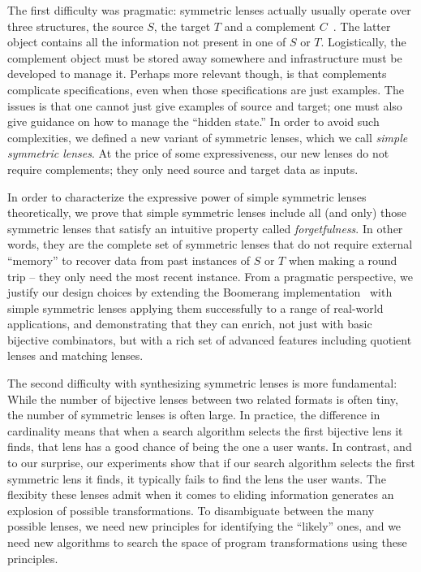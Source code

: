 \documentclass[acmsmall,screen,anonymous]{acmart}
\begin{document}
The first difficulty was pragmatic: symmetric lenses actually usually operate
over three structures, the source $S$, the target $T$ and a complement
$C$~\cite{symmetric-lenses}. The latter object contains all the information not
present in one of $S$ or $T$. Logistically, the complement object must be stored
away somewhere and infrastructure must be developed to manage it. Perhaps more
relevant though, is that complements complicate specifications, even when those
specifications are just examples. The issues is that one cannot just give
examples of source and target; one must also give guidance on how to manage the
``hidden state.'' In order to avoid such complexities, we defined a new variant
of symmetric lenses, which we call \emph{simple symmetric lenses}. At the price
of some expressiveness, our new lenses do not require complements; they only
need source and target data as inputs.

In order to characterize the expressive power of simple symmetric lenses
theoretically, we prove that simple symmetric lenses include all (and only)
those symmetric lenses that satisfy an intuitive property called
\emph{forgetfulness}. In other words, they are the complete set of symmetric
lenses that do not require external ``memory'' to recover data from past
instances of $S$ or $T$ when making a round trip -- they only need the most
recent instance. From a pragmatic perspective, we justify our design choices by
extending the Boomerang implementation~\cite{Boomerang} with simple symmetric
lenses applying them successfully to a range of real-world applications, and
demonstrating that they can enrich, not just with basic bijective combinators,
but with a rich set of advanced features including quotient lenses and matching
lenses.

The second difficulty with synthesizing symmetric lenses is more
fundamental: While the number of bijective lenses between two
related formats is often tiny, the number of symmetric lenses is often large. In
practice, the difference in cardinality means that when a search algorithm
selects the first bijective lens it finds, that lens has a good chance of being
the one a user wants. In contrast, and to our surprise, our experiments show
that if our search algorithm selects the first symmetric lens it finds, it
typically fails to find the lens the user wants. The flexibity these lenses
admit when it comes to eliding information generates an explosion of possible
transformations. To disambiguate between the many possible lenses, we need new
principles for identifying the ``likely'' ones, and we need new algorithms to
search the space of program transformations using these principles.
\end{document}
